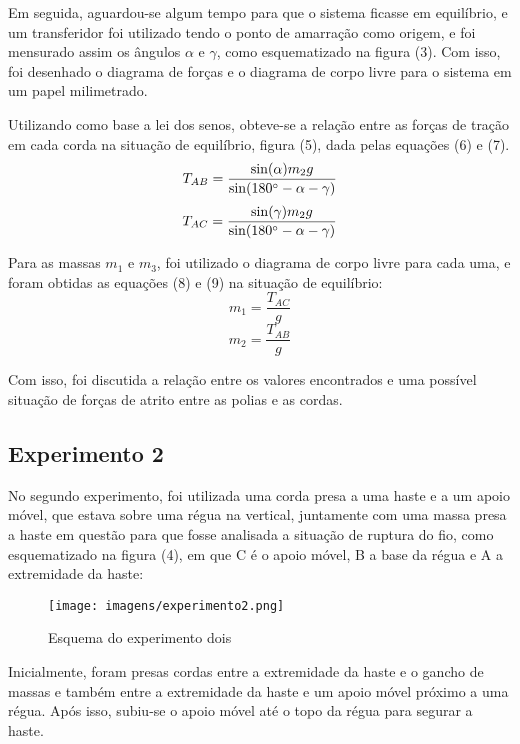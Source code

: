 \documentclass[12pt, letterpaper]{article}
\begin{document}
    Em seguida, aguardou-se algum tempo para que o sistema ficasse em equilíbrio, e um transferidor foi utilizado tendo o ponto de amarração como origem, e foi mensurado assim os ângulos $\alpha$ e $\gamma$, como esquematizado na figura (3). Com isso, foi desenhado o diagrama de forças e o diagrama de corpo livre para o sistema em um papel milimetrado.
    
    Utilizando como base a lei dos senos, obteve-se a relação entre as forças de tração em cada corda na situação de equilíbrio, figura (5), dada pelas equações (6) e (7).
    \begin{equation}
        T_{AB} = \frac{\sin(\alpha)m_{2}g}{\sin({180 \degree - \alpha - \gamma})}
    \end{equation}
    \begin{equation}
        T_{AC} = \frac{\sin(\gamma)m_{2}g}{\sin(180 \degree - \alpha - \gamma)}
    \end{equation}

    Para as massas $m_{1}$ e $m_{3}$, foi utilizado o diagrama de corpo livre para cada uma, e foram obtidas as equações (8) e (9) na situação de equilíbrio:
    \begin{equation}
        m_{1} = \frac{T_{AC}}{g} 
    \end{equation}
    \begin{equation}
        m_{2} = \frac{T_{AB}}{g}
    \end{equation}

    Com isso, foi discutida a relação entre os valores encontrados e uma possível situação de forças de atrito entre as polias e as cordas. 
    
\subsection{Experimento 2}
    No segundo experimento, foi utilizada uma corda presa a uma haste e a um apoio móvel, que estava sobre uma régua na vertical, juntamente com uma massa presa a haste em questão para que fosse analisada a situação de ruptura do fio, como esquematizado na figura (4), em que C é o apoio móvel, B a base da régua e A a extremidade da haste:
        \begin{figure}[!h]
            \centering
            \texttt{[image: imagens/experimento2.png]}
            \caption{Esquema do experimento dois}
            \label{fig:enter-label}
        \end{figure}
    
    Inicialmente, foram presas cordas entre a extremidade da haste e o gancho de massas e também entre a extremidade da haste e um apoio móvel próximo a uma régua. Após isso, subiu-se o apoio móvel até o topo da régua para segurar a haste.
\end{document}
